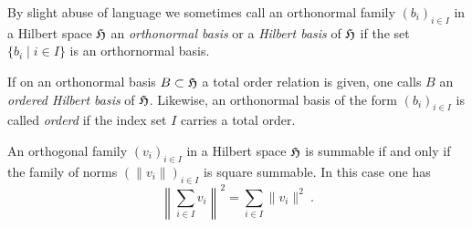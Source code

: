 \begin{remark}
  \begin{environmentlist} 
  \item
    By slight abuse of language we sometimes call an orthonormal family $(b_i)_{i\in I}$ in a Hilbert space $\mathfrak{H}$
    an \emph{orthonormal basis} or a \emph{Hilbert basis} of $\mathfrak{H}$  
    if the set $\{ b_i \mid i\in I \}$ is an orthornormal basis. 
  \item 
    If on an orthonormal basis $B \subset \mathfrak{H}$ a total order relation is given, 
    one calls $B$ an \emph{ordered Hilbert basis} of $\mathfrak{H}$. Likewise,  
    an orthonormal basis of the form $(b_i)_{i\in I}$ is called \emph{orderd} if the index set $I$ carries a total order.
  \end{environmentlist}
\end{remark}

\begin{proposition}\label{thm:pythagorean-theorem-infinite-families}\hspace{1mm}
  An orthogonal family $(v_i)_{i\in I}$ in a Hilbert space $\mathfrak{H}$ is summable if and only if 
  the family of norms $\left(\|v_i\| \right)_{i\in I}$ is square summable. In this case one has 
  \[
     \left\|\sum_{i\in I} v_i\right\|^2 =  \sum_{i\in I} \|v_i\|^2 \ .
  \]
\end{proposition}

